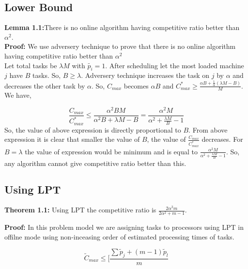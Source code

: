 \documentclass[10pt, conference, compsocconf]{IEEEtran}
\begin{document}
                                                                                      
\subsection{Lower Bound}
\textbf{Lemma 1.1:}There is no online algorithm having competitive  ratio better than $\alpha^{2} $.\\
\textbf{Proof:}  We  use adversery technique to prove that there is no online algorithm having competitive  ratio better than $\alpha^{2} $\\
 
 Let total tasks be $\lambda M$ with $\tilde{p_i}=1$. After scheduling let the most loaded machine $j$ have $B$ tasks. So, $B \geq \lambda$. Adversery technique increases the task on $j$ by $\alpha$ and decreases the other task by $\alpha$. So, $ C_{max}$ becomes $\alpha B$ and ${C^{*}_{max}}\geq \frac{\alpha B + \frac{1}{\alpha }  (\lambda  M - B) }{M}$. We have,
 
 \begin{equation}\nonumber
\frac{C_{max}}{C^{*}_{max}}\leq \frac{\alpha^{2} B M }{\alpha^{2} B + \lambda M - B}=\frac{\alpha^{2}  M }{\alpha^{2}  + \frac{\lambda M}{B}  - 1}
 \end{equation} 
 So, the value of above expression is directly proportional to $B$. From above expression it is clear that smaller the value of $B$, the value of $\frac{C_{max}}{C^{*}_{max}}$ decreases.  For $B= \lambda$ the value of expression would be minimum and is equal to $\frac{\alpha^{2}  M }{\alpha^{2}  + \frac{\lambda M}{B}  - 1}$. So, any algorithm   cannot give competitive ratio better than this.
 
 
 
\subsection{Using LPT}

\textbf{Theorem 1.1:} Using LPT the competitive ratio is $ \frac{2\alpha^{2}m}{2\alpha^{2}+ m-1}$.

\textbf{Proof:} In this problem model we are assigning tasks to processors using LPT in offilne mode using non-inceasing order of estimated processing times of tasks.

 


 
\begin{equation}
\tilde C_{max}\leq  [\frac{\sum{\tilde p_j + (m-1) \tilde p_l} }{m}
\end{equation}
\end{document}
